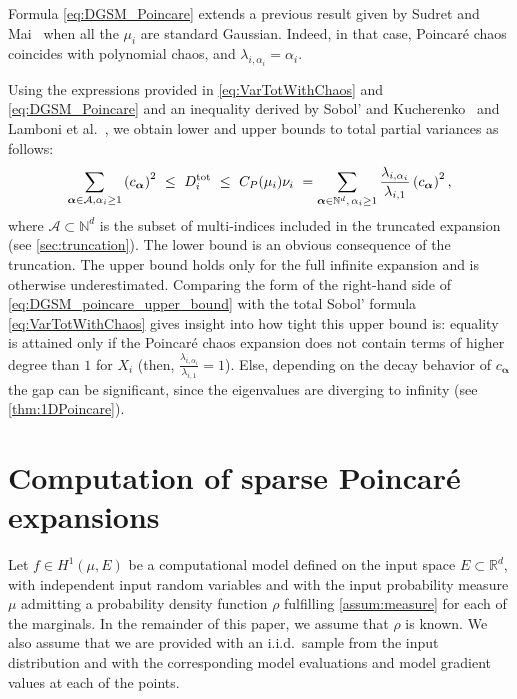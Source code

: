 \documentclass[a4paper,11pt]{article}
\newcommand{\curlyA}{{\mathcal A}}
\newcommand{\Rr}{{\mathbb R}}
\newcommand{\Nn}{\mathbb{N}}
\newcommand{\ve}[1]{\boldsymbol{#1}}
\newcommand{\alp}{{\ve{\alpha}}}
\renewcommand{\citet}[2][]{\cite[#1]{#2}}
\theoremstyle{definition}
\theoremstyle{remark}
\theoremstyle{theorem}
\begin{document}
Formula \eqref{eq:DGSM_Poincare} extends a previous result given by Sudret and Mai~\cite{sudmai15} when all the $\mu_i$ are standard Gaussian. 
Indeed, in that case, Poincar\'e chaos coincides with polynomial chaos, and $\lambda_{i, \alpha_i} = \alpha_i$.


Using the expressions provided in \eqref{eq:VarTotWithChaos} and \eqref{eq:DGSM_Poincare} and an inequality derived by Sobol' and Kucherenko~\citet{Sobol2009} and Lamboni et al.~\citet{Lamboni_et_al_2013}, we obtain lower and upper bounds to total partial variances as follows:
\begin{equation}
\sum_{\alp \in \curlyA, \alpha_i \geq 1} \left(c_\alp \right)^2
\ \leq \ D_i^{\rm{tot}} 
\ \leq \ C_P(\mu_i) \nu_i 
\ = \sum_{\alp \in \Nn^d, \, \alpha_i \geq 1} \frac{\lambda_{i, \alpha_i}}{\lambda_{i, 1}} \left(c_\alp \right)^2,
\label{eq:DGSM_poincare_upper_bound}
\end{equation}
where $\curlyA \subset \Nn^d$ is the subset of multi-indices included in the truncated expansion (see \cref{sec:truncation}).
The lower bound is an obvious consequence of the truncation. 
The upper bound holds only for the full infinite expansion and is otherwise underestimated.
Comparing the form of the right-hand side of \cref{eq:DGSM_poincare_upper_bound} with the total Sobol' formula \cref{eq:VarTotWithChaos} gives insight into how tight this upper bound is: equality is attained only if the Poincar\'e chaos expansion does not contain terms of higher degree than $1$ for $X_i$ (then, $\frac{\lambda_{i, \alpha_i}}{\lambda_{i, 1}}=1$).
Else, depending on the decay behavior of $c_\alp$
the gap can be significant, since the eigenvalues 
are diverging to infinity
(see \cref{thm:1DPoincare}).

\section{Computation of sparse Poincar\'e expansions}
\label{sec:computation}

Let $f \in H^1(\mu, E)$ be a computational model defined on the input space $E \subset \Rr^d$, with independent input random variables and with the input probability measure $\mu$ admitting a probability density function $\rho$ fulfilling \cref{assum:measure} for each of the marginals.
In the remainder of this paper, we assume that $\rho$ is known.
We also assume that we are provided with an i.i.d.\ sample from the input distribution and with the corresponding model evaluations and model gradient values at each of the points.
\end{document}
